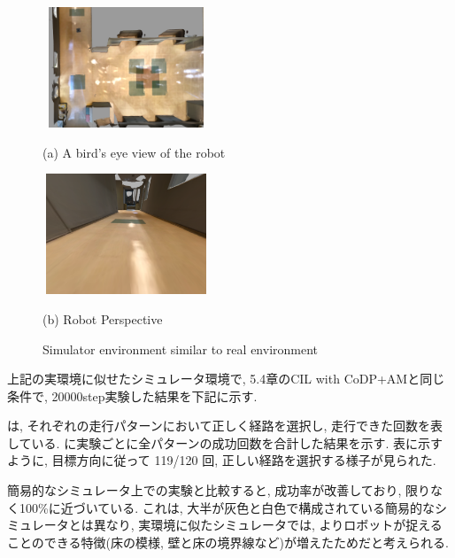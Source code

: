 \begin{figure}[h]
  \centering
  \begin{minipage}[b]{67mm}
    \centering
    \includegraphics[width=50mm, height=36mm]{images/real_sim_up.png}
    \caption*{(a) A bird's eye view of the robot}
  \end{minipage} 
  \begin{minipage}[b]{67mm}
    \centering
    \includegraphics[width=50mm, height=36mm]{images/real_sim_robot.png}
    \caption*{(b) Robot Perspective}
  \end{minipage}
  \caption{Simulator environment similar to real environment}
  \label{Fig:real_sim}
\end{figure}

上記の実環境に似せたシミュレータ環境で, 5.4章のCIL with CoDP+AMと同じ条件で, 20000step実験した結果を下記に示す.

 は, それぞれの走行パターンにおいて正しく経路を選択し, 走行できた回数を表している.  に実験ごとに全パターンの成功回数を合計した結果を示す. 
表に示すように, 目標方向に従って 119/120 回, 正しい経路を選択する様子が見られた.

簡易的なシミュレータ上での実験と比較すると, 成功率が改善しており, 限りなく100\%に近づいている. これは, 大半が灰色と白色で構成されている簡易的なシミュレータとは異なり, 実環境に似たシミュレータでは, よりロボットが捉えることのできる特徴(床の模様, 壁と床の境界線など)が増えたためだと考えられる.

